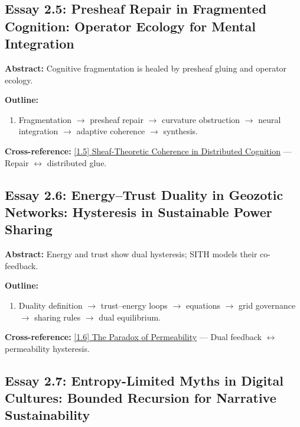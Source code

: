 \documentclass[12pt,a4paper]{article}
\begin{document}
\subsection{Essay 2.5: Presheaf Repair in Fragmented Cognition: Operator Ecology for Mental Integration}
\label{sec:essay2-5}

\textbf{Abstract:} Cognitive fragmentation is healed by presheaf gluing and operator ecology.

\textbf{Outline:}
\begin{enumerate}
\item Fragmentation $\to$ presheaf repair $\to$ curvature obstruction $\to$ neural integration $\to$ adaptive coherence $\to$ synthesis.
\end{enumerate}

\textbf{Cross-reference:} \hyperref[sec:essay1-5]{[1.5] Sheaf-Theoretic Coherence in Distributed Cognition} --- Repair $\leftrightarrow$ distributed glue.

\subsection{Essay 2.6: Energy--Trust Duality in Geozotic Networks: Hysteresis in Sustainable Power Sharing}
\label{sec:essay2-6}

\textbf{Abstract:} Energy and trust show dual hysteresis; SITH models their co-feedback.

\textbf{Outline:}
\begin{enumerate}
\item Duality definition $\to$ trust--energy loops $\to$ equations $\to$ grid governance $\to$ sharing rules $\to$ dual equilibrium.
\end{enumerate}

\textbf{Cross-reference:} \hyperref[sec:essay1-6]{[1.6] The Paradox of Permeability} --- Dual feedback $\leftrightarrow$ permeability hysteresis.

\subsection{Essay 2.7: Entropy-Limited Myths in Digital Cultures: Bounded Recursion for Narrative Sustainability}
\label{sec:essay2-7}
\end{document}
